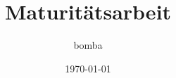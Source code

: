 \documentclass[
  a4paper,
  11pt,
  oneside
]{article}
\begin{document}
\title{Maturitätsarbeit}
\author{bomba}
\date{\today}
\maketitle

\end{document}
